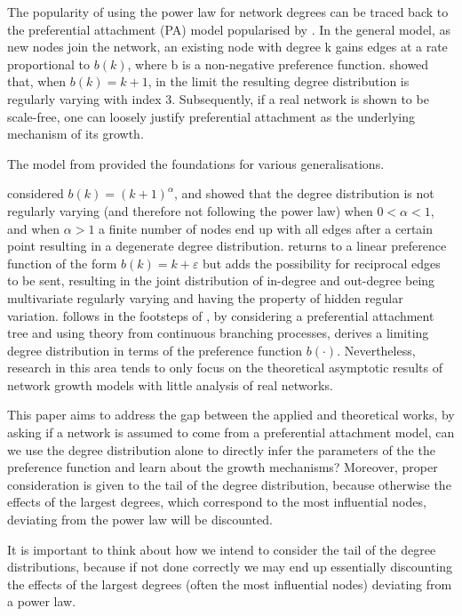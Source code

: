 \documentclass[
  sn-basic,
]{sn-jnl}
\theoremstyle{plain}
\theoremstyle{plain}
\theoremstyle{remark}
\begin{document}
The popularity of using the power law for network degrees can be traced
back to the preferential attachment (PA) model popularised by
\citet{Barabasi99}. In the general model, as new nodes join the network,
an existing node with degree k gains edges at a rate proportional to
\(b(k)\), where b is a non-negative preference function.
\citet{Barabasi99} showed that, when \(b(k) = k + 1\), in the limit the
resulting degree distribution is regularly varying with index 3.
Subsequently, if a real network is shown to be scale-free, one can
loosely justify preferential attachment as the underlying mechanism of
its growth.

The model from \citet{Barabasi99} provided the foundations for various
generalisations.

\citet{krapivsky01} considered \(b(k) = (k+1)^\alpha\), and showed that
the degree distribution is not regularly varying (and therefore not
following the power law) when \(0<\alpha<1\), and when \(\alpha>1\) a
finite number of nodes end up with all edges after a certain point
resulting in a degenerate degree distribution. \citet{wang2022random}
returns to a linear preference function of the form
\(b(k) = k+\varepsilon\) but adds the possibility for reciprocal edges
to be sent, resulting in the joint distribution of in-degree and
out-degree being multivariate regularly varying and having the property
of hidden regular variation. \citet{rudas07} follows in the footsteps of
\citet{krapivsky01} , by considering a preferential attachment tree and
using theory from continuous branching processes, derives a limiting
degree distribution in terms of the preference function \(b(\cdot)\).
Nevertheless, research in this area tends to only focus on the
theoretical asymptotic results of network growth models with little
analysis of real networks.

This paper aims to address the gap between the applied and theoretical
works, by asking if a network is assumed to come from a preferential
attachment model, can we use the degree distribution alone to directly
infer the parameters of the the preference function and learn about the
growth mechanisms? Moreover, proper consideration is given to the tail
of the degree distribution, because otherwise the effects of the largest
degrees, which correspond to the most influential nodes, deviating from
the power law will be discounted.

It is important to think about how we intend to consider the tail of the
degree distributions, because if not done correctly we may end up
essentially discounting the effects of the largest degrees (often the
most influential nodes) deviating from a power law.
\end{document}
